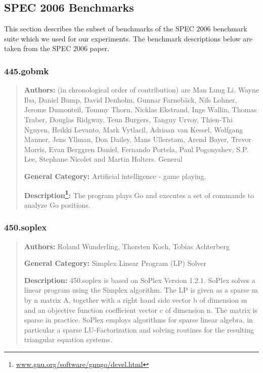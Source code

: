 \documentclass[onecolumn, openany, master, english, seal, signatures]{dbrgrptt}
\begin{document}
\subsection{SPEC 2006 Benchmarks}

This section describes the subset of benchmarks of the SPEC 2006 benchmark suite \cite{henning2006spec} which we used for our experiments. The benchmark descriptions below are taken from the SPEC 2006 paper.

\subsubsection{445.gobmk}

\begin{quote}
\textbf{Authors:} (in chronological order of contribution) are Man Lung Li, Wayne Iba, Daniel Bump, David Denholm, Gunnar Farneb\"ack, Nils Lohner, Jerome Dumonteil, Tommy Thorn, Nicklas Ekstrand, Inge Wallin, Thomas Traber, Douglas Ridgway, Teun Burgers, Tanguy Urvoy, Thien-Thi Nguyen, Heikki Levanto, Mark Vytlacil, Adriaan van Kessel, Wolfgang Manner, Jens Yllman, Don Dailey, Mans Ullerstam, Arend Bayer, Trevor Morris, Evan Berggren Daniel, Fernando Portela, Paul Pogonyshev, S.P. Lee, Stephane Nicolet and Martin Holters. General

\textbf{General Category:} Artificial intelligence - game playing.

\textbf{Description\footnote{\url{www.gnu.org/software/gnugo/devel.html}}:} The program plays Go and executes a set of commands to analyze Go positions.
\end{quote}

\subsubsection{450.soplex}

\begin{quote}
\textbf{Authors:} Roland Wunderling, Thorsten Koch, Tobias Achterberg

\textbf{General Category:} Simplex Linear Program (LP) Solver

\textbf{Description:} 450.soplex is based on SoPlex Version 1.2.1. SoPlex solves a linear program using the Simplex algorithm. The LP is given as a sparse m by n matrix A, together with a right hand side vector b of dimension m and an objective function coefficient vector c of dimension n. The matrix is sparse in practice. SoPlex employs algorithms for sparse linear algebra, in particular a sparse LU-Factorization and solving routines for the resulting triangular equation systems.
\end{quote}
\end{document}
